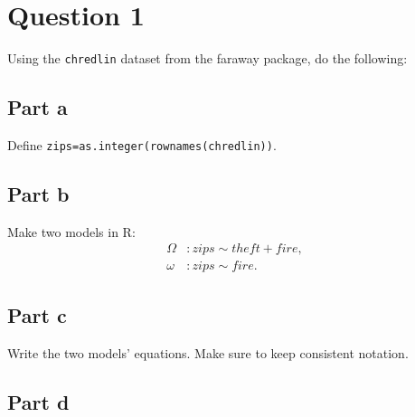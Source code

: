 \section{Question 1}

\begin{question}
    Using the \verb+chredlin+ dataset from the faraway package, do the following:
\end{question}

\subsection{Part a}

\begin{question}
    Define \verb+zips=as.integer(rownames(chredlin))+.
\end{question}

\begin{answer}
    
\end{answer}

\subsection{Part b}

\begin{question}
    Make two models in R:
    \begin{align}
        \Omega &: zips \sim theft + fire,\\
        \omega &: zips \sim fire.
    \end{align}
    
\end{question}

\begin{answer}
    
\end{answer}

\subsection{Part c}

\begin{question}
    Write the two models’ equations. Make sure to keep consistent notation.
\end{question}

\begin{answer}
    
\end{answer}

\subsection{Part d}

